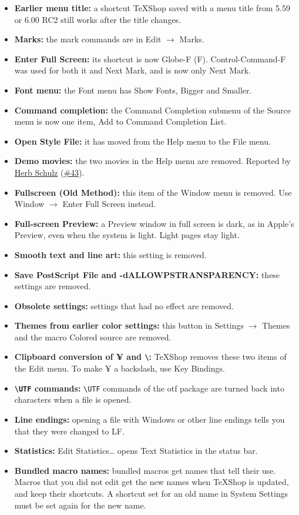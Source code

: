\documentclass[11pt,letterpaper]{article}
\begin{document}
\begin{itemize}
\item \textbf{Earlier menu title:} a shortcut TeXShop saved with a menu title from 5.59 or 6.00 RC2 still works after the title changes.
\item \textbf{Marks:} the mark commands are in Edit \(\rightarrow\) Marks.
\item \textbf{Enter Full Screen:} its shortcut is now Globe-F (\faGlobe{}F). Control-Command-F was used for both it and Next Mark, and is now only Next Mark.
\item \textbf{Font menu:} the Font menu has Show Fonts, Bigger and Smaller.
\item \textbf{Command completion:} the Command Completion submenu of the Source menu is now one item, Add to Command Completion List.
\item \textbf{Open Style File:} it has moved from the Help menu to the File menu.
\item \textbf{Demo movies:} the two movies in the Help menu are removed. Reported by \href{https://github.com/herbs}{Herb Schulz} (\href{https://github.com/TeXShopProject/TeXShop/issues/43}{\#43}).
\item \textbf{Fullscreen (Old Method):} this item of the Window menu is removed. Use Window \(\rightarrow\) Enter Full Screen instead.
\item \textbf{Full-screen Preview:} a Preview window in full screen is dark, as in Apple’s Preview, even when the system is light. Light pages stay light.
\item \textbf{Smooth text and line art:} this setting is removed.
\item \textbf{Save PostScript File and -dALLOWPSTRANSPARENCY:} these settings are removed.
\item \textbf{Obsolete settings:} settings that had no effect are removed.
\item \textbf{Themes from earlier color settings:} this button in Settings \(\rightarrow\) Themes and the macro Colored source are removed.
\item \textbf{Clipboard conversion of ¥ and \texttt{\textbackslash{}}:} TeXShop removes these two items of the Edit menu. To make ¥ a backslash, use Key Bindings.
\item \textbf{\texttt{\textbackslash{}UTF} commands:} \texttt{\textbackslash{}UTF} commands of the otf package are turned back into characters when a file is opened.
\item \textbf{Line endings:} opening a file with Windows or other line endings tells you that they were changed to LF.
\item \textbf{Statistics:} Edit \guilsinglright{} Statistics… opens Text Statistics in the status bar.
\item \textbf{Bundled macro names:} bundled macros get names that tell their use. Macros that you did not edit get the new names when TeXShop is updated, and keep their shortcuts. A shortcut set for an old name in System Settings must be set again for the new name.
\end{itemize}
\end{document}
